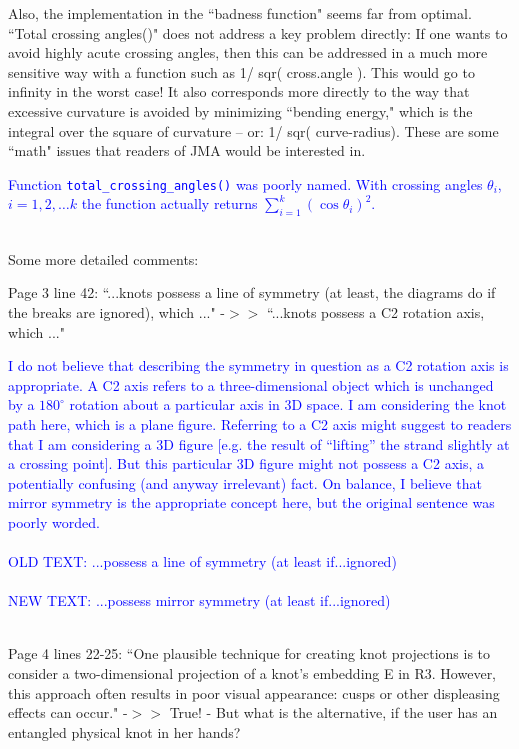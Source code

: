 \documentclass[12pt]{article}
\begin{document}
Also, the implementation in the ``badness function" seems far from
optimal.  ``Total crossing angles()" does not address a key problem
directly: If one wants to avoid highly acute crossing angles, then
this can be addressed in a much more sensitive way with a function
such as 1/ sqr( cross.angle ).  This would go to infinity in the worst
case!  It also corresponds more directly to the way that excessive
curvature is avoided by minimizing ``bending energy," which is the
integral over the square of curvature -- or: 1/ sqr( curve-radius).
These are some ``math" issues that readers of JMA would be interested
in.


\textcolor{blue}{Function {\tt total\_crossing\_angles()} was poorly
  named.  With crossing angles $\theta_i$, $i=1,2,\ldots k$ the
  function actually returns $\sum_{i=1}^k\left(\cos\theta_i\right)^2$.
  \\ \\}

Some more detailed comments:

Page 3 line 42: ``...knots possess a line of symmetry (at least, the
diagrams do if the breaks are ignored), which ..."  -$>>$ ``...knots
possess a C2 rotation axis, which ..."

\textcolor{blue}{I do not believe that describing the symmetry in
  question as a C2 rotation axis is appropriate.  A C2 axis refers to
  a three-dimensional object which is unchanged by a $180^\circ$
  rotation about a particular axis in 3D space.  I am considering the
  knot path here, which is a plane figure.  Referring to a C2 axis
  might suggest to readers that I am considering a 3D figure [e.g. the
    result of ``lifting'' the strand slightly at a crossing point].
  But this particular 3D figure might not possess a C2 axis, a
  potentially confusing (and anyway irrelevant) fact.  On balance, I
  believe that mirror symmetry is the appropriate concept here, but
  the original sentence was poorly worded.\\ \\
OLD TEXT: ...possess a line of symmetry (at least if...ignored)\\ \\
NEW TEXT: ...possess mirror symmetry (at least if...ignored)\\ \\
}



Page 4 lines 22-25: ``One plausible technique for creating knot
projections is to consider a two-dimensional projection of a knot's
embedding E in R3. However, this approach often results in poor visual
appearance: cusps or other displeasing effects can occur."  -$>>$ True!
- But what is the alternative, if the user has an entangled physical
knot in her hands?
\end{document}
